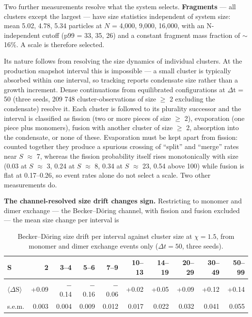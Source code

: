 \documentclass[aps,pre,preprint,superscriptaddress,nofootinbib,longbibliography]{revtex4-2}
\begin{document}
Two further measurements resolve what the system selects. \textbf{Fragments} --- all clusters except the largest --- have size statistics independent of system size: mean 5.02, 4.78, 5.34 particles at $N$ = 4,000, 9,000, 16,000, with an N-independent cutoff (p99 = 33, 35, 26) and a constant fragment mass fraction of $\sim$16\%. A scale is therefore selected.

Its nature follows from resolving the size dynamics of individual clusters. At the production snapshot interval this is impossible --- a small cluster is typically absorbed within one interval, so tracking reports condensate size rather than a growth increment. Dense continuations from equilibrated configurations at $\Delta$t = 50 (three seeds, 209 748 cluster-observations of size $\ge$ 2 excluding the condensate) resolve it. Each cluster is followed to its plurality successor and the interval is classified as fission (two or more pieces of size $\ge$ 2), evaporation (one piece plus monomers), fusion with another cluster of size $\ge$ 2, absorption into the condensate, or none of these. Evaporation must be kept apart from fission: counted together they produce a spurious crossing of ``split'' and ``merge'' rates near $S$ $\approx$ 7, whereas the fission probability itself rises monotonically with size (0.03 at $S$ $\approx$ 3, 0.24 at $S$ $\approx$ 8, 0.34 at $S$ $\approx$ 23, 0.54 above 100) while fusion is flat at 0.17--0.26, so event rates alone do not select a scale. Two other measurements do.

\textbf{The channel-resolved size drift changes sign.} Restricting to monomer and dimer exchange --- the Becker--D\"oring channel, with fission and fusion excluded --- the mean size change per interval is

\begin{table}[htbp]
\caption{Becker--D\"oring size drift per interval against cluster size at $\chi=1.5$, from monomer and dimer exchange events only ($\Delta t=50$, three seeds).}
\label{tab:9}
\begin{ruledtabular}
\begin{tabular}{lrrrrrrrrr}
S & 2 & 3--4 & 5--6 & 7--9 & 10--13 & 14--19 & 20--29 & 30--49 & 50--99 \\
\hline
$\langle \Delta$S$\rangle$ & +0.09 & $-$0.14 & $-$0.16 & $-$0.06 & +0.02 & +0.05 & +0.09 & +0.12 & +0.14 \\
s.e.m. & 0.003 & 0.004 & 0.009 & 0.012 & 0.017 & 0.022 & 0.032 & 0.041 & 0.055 \\
\end{tabular}
\end{ruledtabular}
\end{table}
\end{document}
